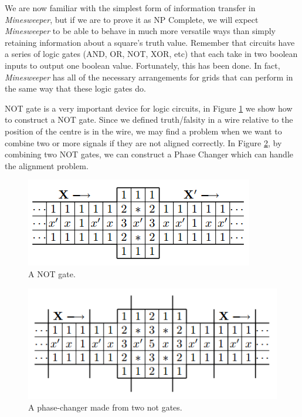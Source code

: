 \documentclass{article}
\begin{document}
We are now familiar with the simplest form of information transfer in \textit{Minesweeper}, but if we are to prove it as NP Complete, we will expect \textit{Minesweeper} to be able to behave in much more versatile ways than simply retaining information about a square’s truth value. Remember that circuits have a series of logic gates (AND, OR, NOT, XOR, etc) that each take in two boolean inputs to output one boolean value. Fortunately, this has been done. In fact, \textit{Minesweeper} has all of the necessary arrangements for grids that can perform in the same way that these logic gates do.

NOT gate is a very important device for logic circuits, in Figure \ref{fig_not} we show how to construct a NOT gate. Since we defined truth/falsity in a wire relative to the position of the centre is in the wire, we may find a problem when we want to combine two or more signals if they are not aligned correctly. In Figure \ref{fig_pc}, by combining two NOT gates, we can construct a Phase Changer which can handle the alignment problem.

\begin{figure}[H]
  \centering
  \includegraphics[scale=.9]{images/not.png}
  \caption{A NOT gate.}
  \label{fig_not}
\end{figure}

\begin{figure}[H]
  \centering
  \includegraphics[scale=.9]{images/phase-changer.png}
  \caption{A phase-changer made from two not gates.}
  \label{fig_pc}
\end{figure}
\end{document}
